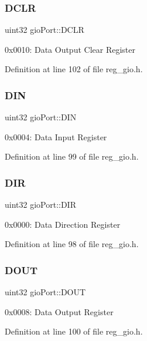 \subsubsection{\texorpdfstring{D\+C\+LR}{DCLR}}
{\footnotesize\ttfamily uint32 gio\+Port\+::\+D\+C\+LR}

0x0010\+: Data Output Clear Register 

Definition at line 102 of file reg\+\_\+gio.\+h.

\mbox{\label{structgioPort_a030ab5436eb43138b1cb24a9fb722db0}} 
\subsubsection{\texorpdfstring{D\+IN}{DIN}}
{\footnotesize\ttfamily uint32 gio\+Port\+::\+D\+IN}

0x0004\+: Data Input Register 

Definition at line 99 of file reg\+\_\+gio.\+h.

\mbox{\label{structgioPort_a1f1a5295bf3ad0455785999aa4c4ac1b}} 
\subsubsection{\texorpdfstring{D\+IR}{DIR}}
{\footnotesize\ttfamily uint32 gio\+Port\+::\+D\+IR}

0x0000\+: Data Direction Register 

Definition at line 98 of file reg\+\_\+gio.\+h.

\mbox{\label{structgioPort_a2a53ae1c23a10b5fc826b78a38927160}} 
\subsubsection{\texorpdfstring{D\+O\+UT}{DOUT}}
{\footnotesize\ttfamily uint32 gio\+Port\+::\+D\+O\+UT}

0x0008\+: Data Output Register 

Definition at line 100 of file reg\+\_\+gio.\+h.

\mbox{\label{structgioPort_a4cf17b67c320fb97fcb65bab69838b4c}} 
